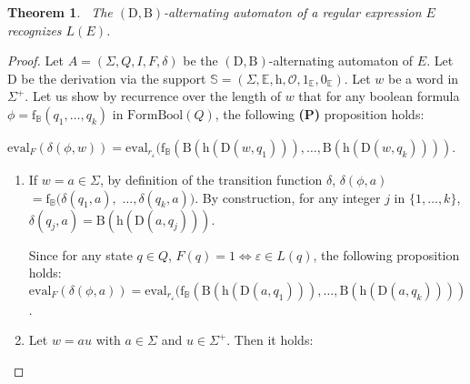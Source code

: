 \documentclass{article}
\newtheorem{theorem}{Theorem}
\begin{document}
  \begin{theorem}~\label{thm aa lang}
     The $(\mathrm{D},\mathrm{B})$-alternating automaton of a regular expression $E$ recognizes $L(E)$.
  \end{theorem}
  \begin{proof}
  Let $A=(\Sigma,Q,I,F,\delta)$ be the $(\mathrm{D},\mathrm{B})$-alternating automaton of $E$. 
    Let $\mathrm{D}$ be the derivation via the support $\mathbb{S}=(\Sigma,\mathbb{E},\mathrm{h},\mathcal{O},1_{\mathbb{E}},0_{\mathbb{E}})$. Let $w$ be a word in $\Sigma^{+}$. 
       Let us show by recurrence over the length of $w$ that for any boolean formula $\phi=\mathrm{f}_{\mathbb{B}}(q_1,\ldots,q_k)$ in $\mathrm{FormBool}(Q)$, the following \textbf{(P)} proposition holds:
      
        \centerline{
          $\mathrm{eval}_{F}(\delta(\phi,w))=\mathrm{eval}_{r_{\varepsilon}}(\mathrm{f}_{\mathbb{B}}(\mathrm{B}(\mathrm{h}(\mathrm{D}(w,q_1))),\ldots,\mathrm{B}(\mathrm{h}(\mathrm{D}(w,q_k))))$.
        }
        
        \begin{enumerate}
          \item If $w=a\in\Sigma$, by definition of the transition function $\delta$,          
           $\delta(\phi,a)$ $=\mathrm{f}_{\mathbb{B}}(\delta(q_1,a),$ $\ldots,\delta(q_k,a))$. By construction, for any integer $j$ in $\{1,\ldots,k\}$, $\delta(q_j,a)=\mathrm{B}(\mathrm{h}(\mathrm{D}(a,q_j)))$.
          
           Since for any state $q\in Q$, $F(q)=1\Leftrightarrow \varepsilon\in L(q)$, the following proposition holds:   $\mathrm{eval}_{F}(\delta(\phi,a))=\mathrm{eval}_{r_{\varepsilon}}(\mathrm{f}_{\mathbb{B}}(\mathrm{B}(\mathrm{h}(\mathrm{D}(a,q_1))),\ldots,\mathrm{B}(\mathrm{h}(\mathrm{D}(a,q_k))))$.
          
          \item Let $w=au$ with $a\in\Sigma$ and $u\in\Sigma^+$. Then it holds:
          

\end{enumerate}
\end{proof}
\end{document}
